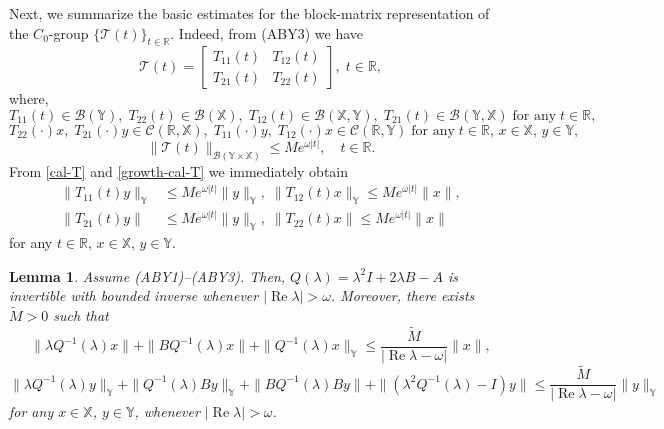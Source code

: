 \documentclass[11pt]{amsart}
\numberwithin{equation}{section}
\newcommand{\RR}{{\mathbb R}}
\newtheorem{lemma}[theorem]{Lemma}
\theoremstyle{remark}
\theoremstyle{definition}
\newcommand\cT{{\mathcal T}}
\newcommand\bX{{\mathbb X}}
\newcommand\bY{{\mathbb Y}}
\begin{document}
Next,  we summarize the basic estimates for the block-matrix representation of the $C_0$-group $\{\cT(t)\}_{t\in\RR}$. Indeed, from (ABY3) we have  
\begin{equation}\label{cal-T}
	\cT(t) = \begin{bmatrix} T_{11}(t) & T_{12}(t) \\ T_{21}(t) & T_{22}(t) \end{bmatrix}, \; t \in \mathbb{R},
\end{equation}
where,
\begin{equation}\label{cal-T-boundedness}
	T_{11}(t) \in \mathcal{B}(\bY),\; T_{22}(t) \in \mathcal{B}(\bX),\;
	T_{12}(t) \in \mathcal{B}(\bX,\bY),\; T_{21}(t) \in \mathcal{B}(\bY,\bX)\;\mbox{for any}\; t\in\RR,
\end{equation}
\begin{equation}\label{cal-T-continuity}
	T_{22}(\cdot)x,\; T_{21}(\cdot)y \in \mathcal{C}(\mathbb{R},\bX),\;
	T_{11}(\cdot)y,\; T_{12}(\cdot)x \in \mathcal{C}(\mathbb{R},\bY)\;\mbox{for any}\; t\in\RR,\, x\in\bX,\, y\in\bY,
\end{equation}
\begin{equation}\label{growth-cal-T}
	\|\cT(t)\|_{\mathcal{B}(\bY\times\bX)} \leq M e^{\omega|t|}, \quad t \in \mathbb{R}.
\end{equation}
From \eqref{cal-T} and \eqref{growth-cal-T} we immediately obtain
\begin{align}\label{growth-Tij}
	\|T_{11}(t)y\|_\bY &\leq M e^{\omega|t|}\|y\|_\bY,\; 
	\|T_{12}(t)x\|_\bY\leq M e^{\omega|t|}\|x\|, \nonumber\\
	\|T_{21}(t)y\| &\leq M e^{\omega|t|}\|y\|_\bY,\;
	\|T_{22}(t)x\| \leq M e^{\omega|t|}\|x\| 
\end{align}
for any $t \in \mathbb{R}$, $x \in \bX$, $y \in \bY$.
\begin{lemma}\label{l3.3}
	Assume \textnormal{(ABY1)--(ABY3)}. Then, $Q(\lambda) = \lambda^2 I + 2\lambda B - A$ is invertible with bounded inverse whenever $|\operatorname{Re}\lambda| > \omega$. Moreover, there exists $\widetilde{M} > 0$ such that
	\begin{equation}\label{Q-inverse-X}
		\|\lambda Q^{-1}(\lambda)x\|+\|BQ^{-1}(\lambda)x\|+\|Q^{-1}(\lambda)x\|_\bY\leq \frac{\widetilde{M}}{|\operatorname{Re}\lambda - \omega|}\|x\|,
	\end{equation}
	\begin{equation}\label{Q-inverse-Y}
		\|\lambda Q^{-1}(\lambda)y\|_\bY +\|Q^{-1}(\lambda)By\|_\bY+\|BQ^{-1}(\lambda)By\|+\|(\lambda^2 Q^{-1}(\lambda) - I)y\|\leq \frac{\widetilde{M}}{|\operatorname{Re}\lambda - \omega|}\|y\|_\bY
	\end{equation}
	for any $x \in\bX$, $y \in \bY$, whenever $|\operatorname{Re}\lambda| > \omega$.
\end{lemma}
\end{document}
